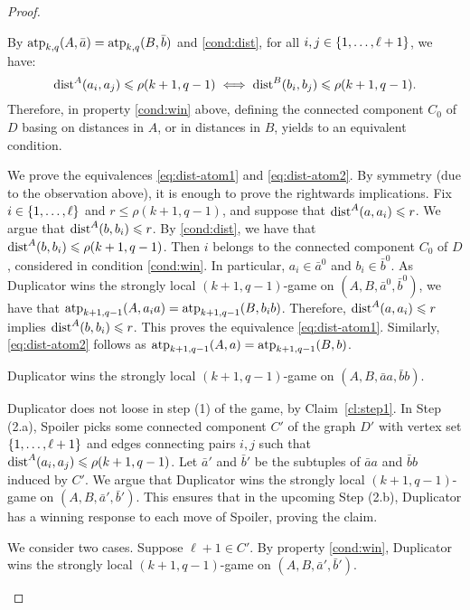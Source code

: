 \begin{proof}
\begin{claimproof}
By $\textnormal{atp}_{k,q}(A, \bar a)=\textnormal{atp}_{k,q}(B, \bar b)$ and \ref{cond:dist}, for all $i,j\in\{1,\ldots,\ell+1\}$, we have:
$$\mathrm{dist}^A(a_i,a_j)\leqslant \rho(k+1,q-1)\iff \mathrm{dist}^B(b_i,b_j)\leqslant \rho(k+1,q-1).$$
Therefore, in property \ref{cond:win} above, 
defining the connected component $C_0$ of $D$
basing on distances in $A$, or in distances in $B$, yields to an equivalent condition.

We prove the equivalences \eqref{eq:dist-atom1} and \eqref{eq:dist-atom2}. By symmetry (due to the observation above), it is enough to prove the rightwards implications. 
Fix  $i\in\{1,\ldots,\ell\}$ and $r\le \rho(k+1,q-1)$, and suppose that  $\mathrm{dist}^A(a,a_i)\leqslant r$.
We argue that $\mathrm{dist}^A(b,b_i)\leqslant r$.
By \ref{cond:dist}, we have that 
$\mathrm{dist}^A(b,b_i)\leqslant \rho(k+1,q-1)$.
Then $i$ belongs to the connected component $C_0$ of $D$, considered in condition \ref{cond:win}. 
In particular, $a_i\in \bar a^0$ and $b_i\in \bar b^0$.
As Duplicator wins the strongly local $(k+1,q-1)$-game on $(A,B,\bar a^0,\bar b^0)$, 
we have that $\textnormal{atp}_{k+1,q-1}(A,a_i a)=\textnormal{atp}_{k+1,q-1}(B,b_i b)$. Therefore, 
$\mathrm{dist}^A(a,a_i)\leqslant r$ implies $\mathrm{dist}^A(b,b_i)\leqslant r$.
This proves the equivalence \eqref{eq:dist-atom1}.
Similarly, \eqref{eq:dist-atom2} follows as $\textnormal{atp}_{k+1,q-1}(A,a)=\textnormal{atp}_{k+1,q-1}(B,b)$.
\end{claimproof}

\begin{claim}\label{cl:sloco}
    Duplicator wins the strongly local $(k+1,q-1)$-game on $(A,B,\bar aa,\bar bb)$.
\end{claim}
\begin{claimproof}
Duplicator does not loose in step (1) of the  game, by Claim~\ref{cl:step1}.
In Step (2.a), Spoiler picks some connected component $C'$ of the graph $D'$ 
with vertex set $\{1,\ldots,\ell+1\}$ and edges connecting pairs $i,j$ such that $\mathrm{dist}^A(a_i,a_j)\leqslant \rho(k+1,q-1)$.
Let $\bar a'$ and $\bar b'$ be the subtuples of $\bar aa$ and $\bar bb$ induced by $C'$.
We argue that 
Duplicator wins the strongly local $(k+1,q-1)$-game on $(A,B,\bar a',\bar b')$.
This ensures that in the upcoming Step (2.b),
Duplicator has a winning response to each move of Spoiler, proving the claim.



We consider two cases.
Suppose $\ell+1\in C'$. By  property \ref{cond:win}, Duplicator wins the strongly local $(k+1,q-1)$-game on $(A,B,\bar a',\bar b')$. 


\end{claimproof}
\end{proof}
